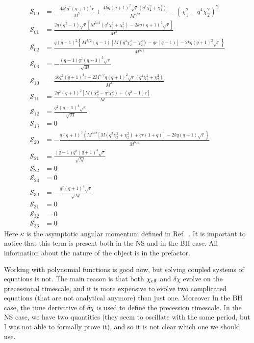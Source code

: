 \documentclass[floats,floatfix,showpacs,amssymb,prd,twocolumn,superscriptaddress,nofootinbib,nolongbibliography,reprint,onecolumn]{revtex4-2}
\begin{document}
\begin{align}
  \mathcal{S}_{00}&=-\frac{4 k^2 q^2 (q+1)^4 r}{M^5}+\frac{4 k q (q+1)^2 \sqrt{r} \left(q^4\chi_2^2+\chi_1^2\right)}{M^{5/2}}-\left(\chi_1^2-q^4\chi_2^2\right)^2\\
     \mathcal{S}_{01}&=\frac{2 q \left(q^2-1\right) \sqrt{r} \left[M^{5/2} \left(q^4 \chi_2^2+\chi_2^2\right)-2 k q (q+1)^2 \sqrt{r}\right]}{M^3}\\
      \mathcal{S}_{02}&=\frac{q (q+1)^2 \left\{M^{3/2} (q-1) \left[M (q^3 \chi_2^2- \chi_2^2)-q r(q-1)\right]-2 k q (q+1)^2 \sqrt{r}\right\}}{M^{5/2}}\\
     \mathcal{S}_{03}&= -\frac{(q-1) q^2 (q+1)^3 \sqrt{r}}{\sqrt{M}}\\
      \mathcal{S}_{10}&= \frac{4 k q^2 (q+1)^4 r-2 M^{5/2} q (q+1)^2 \sqrt{r} \left(q^4 \chi_2^2+\chi_2^2\right)}{M^3}\\
           \mathcal{S}_{11}&= \frac{2 q^2 (q+1)^2 \left[M \left(\chi_2^2-q^2 \chi_2^2\right)+\left(q^2-1\right) r\right]}{M}\\
                 \mathcal{S}_{12}&=\frac{q^2 (q+1)^4 \sqrt{r}}{\sqrt{M}}\\
      \mathcal{S}_{13}&=0\\
         \mathcal{S}_{20}&=-\frac{q (q+1)^3 \left\{M^{3/2} \left[ M( q^3 \chi_2^2+ \chi_2^2)+q r(1+q)\right]-2 k q (q+1) \sqrt{r}\right\}}{M^{5/2}}\\
      \mathcal{S}_{21}&=     \frac{(q-1) q^2 (q+1)^3 \sqrt{r}}{\sqrt{M}}\\
       \mathcal{S}_{22}&=  0\\
          \mathcal{S}_{23}&=  0\\
           \mathcal{S}_{30}&=  -\frac{q^2 (q+1)^4 \sqrt{r}}{\sqrt{M}}\\  
               \mathcal{S}_{31}&= 0\\
                   \mathcal{S}_{32}&= 0\\
                       \mathcal{S}_{33}&= 0
\end{align}
Here $\kappa$ is the asymptotic angular momentum defined in Ref.~\cite{2023PhRvD.108b4042G}. It is important to notice that this term is present both in the NS and in the BH case. All information about the nature of the object is in the prefactor. 


Working with polynomial functions is good now, but solving coupled systems of equations is not. The main reason is that both $\chi_{\rm eff}$ and $\delta \chi$ evolve on the precessional timescale, and it is more expensive to evolve two complicated equations (that are not analytical anymore) than just one. Moreover In the BH case, the time derivative of $\delta \chi$  is used to define the precession timescale. In the NS case, we have two quantities (they seem to oscillate with the same period, but I was not able to formally prove it), and so it is not clear which one we should use. 
\end{document}
